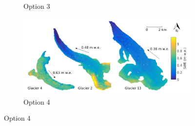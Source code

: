 \documentclass[12pt]{article}
\begin{document}
\begin{figure}
\begin{subfigure}[b]{0.475\textwidth}
            \caption[]%
            {{\small Option 3}}    
        \end{subfigure}
        \quad
        \begin{subfigure}[b]{0.475\textwidth}   
            \centering 
            \includegraphics[width=\textwidth]{MLRmap_Modelled_Observed_Opt4.png}
            \caption[]%
            {{\small Option 4}}    
        \end{subfigure}
        

\end{figure}
\end{document}
